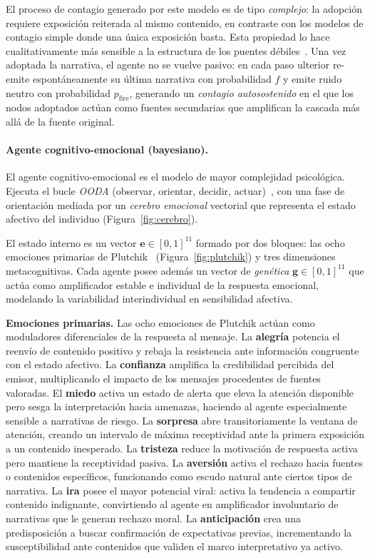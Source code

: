 El proceso de contagio generado por este modelo es de tipo \emph{complejo}: la adopción requiere exposición reiterada al mismo contenido, en contraste con los modelos de contagio simple donde una única exposición basta. Esta propiedad lo hace cualitativamente más sensible a la estructura de los puentes débiles~\cite{CentolaMacy2007}. Una vez adoptada la narrativa, el agente no se vuelve pasivo: en cada paso ulterior re-emite espontáneamente su última narrativa con probabilidad $f$ y emite ruido neutro con probabilidad $p_{\text{fire}}$, generando un \emph{contagio autosostenido} en el que los nodos adoptados actúan como fuentes secundarias que amplifican la cascada más allá de la fuente original.

\paragraph{Agente cognitivo-emocional (bayesiano).}
El agente cognitivo-emocional es el modelo de mayor complejidad psicológica. Ejecuta el bucle \emph{OODA} (observar, orientar, decidir, actuar)~\cite{RushingHerschXu2026}, con una fase de orientación mediada por un \emph{cerebro emocional} vectorial que representa el estado afectivo del individuo (Figura~\ref{fig:cerebro}).

El estado interno es un vector $\mathbf{e} \in [0,1]^{11}$ formado por dos bloques: las ocho emociones primarias de Plutchik~\cite{Plutchik1980} (Figura~\ref{fig:plutchik}) y tres dimensiones metacognitivas. Cada agente posee además un vector de \emph{genética} $\mathbf{g} \in [0,1]^{11}$ que actúa como amplificador estable e individual de la respuesta emocional, modelando la variabilidad interindividual en sensibilidad afectiva.

\smallskip\noindent\textbf{Emociones primarias.}\quad
Las ocho emociones de Plutchik actúan como moduladores diferenciales de la respuesta al mensaje. La \textbf{alegría} potencia el reenvío de contenido positivo y rebaja la resistencia ante información congruente con el estado afectivo. La \textbf{confianza} amplifica la credibilidad percibida del emisor, multiplicando el impacto de los mensajes procedentes de fuentes valoradas. El \textbf{miedo} activa un estado de alerta que eleva la atención disponible pero sesga la interpretación hacia amenazas, haciendo al agente especialmente sensible a narrativas de riesgo. La \textbf{sorpresa} abre transitoriamente la ventana de atención, creando un intervalo de máxima receptividad ante la primera exposición a un contenido inesperado. La \textbf{tristeza} reduce la motivación de respuesta activa pero mantiene la receptividad pasiva. La \textbf{aversión} activa el rechazo hacia fuentes o contenidos específicos, funcionando como escudo natural ante ciertos tipos de narrativa. La \textbf{ira} posee el mayor potencial viral: activa la tendencia a compartir contenido indignante, convirtiendo al agente en amplificador involuntario de narrativas que le generan rechazo moral. La \textbf{anticipación} crea una predisposición a buscar confirmación de expectativas previas, incrementando la susceptibilidad ante contenidos que validen el marco interpretativo ya activo.

